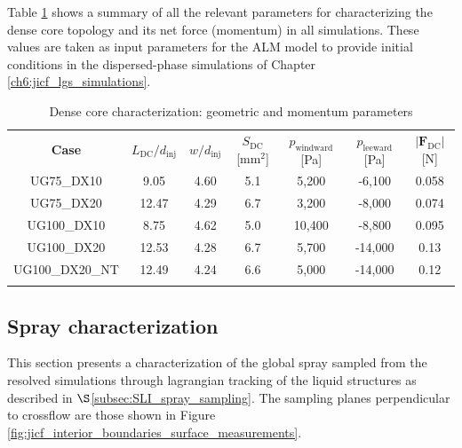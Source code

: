 Table \ref{tab:dense_core_geometry_pressures_and_force_parameters} shows a summary of all the relevant parameters for characterizing the dense core topology and its net force (momentum) in all simulations. These values are taken as input parameters for the ALM model to provide initial conditions in the dispersed-phase simulations of Chapter \ref{ch6:jicf_lgs_simulations}.


\begin{table}[!h]
\centering
\caption{Dense core characterization: geometric and momentum parameters}
\vspace*{-0.1in}
\begin{tabular}{ccccccc}
\thickhline
\textbf{Case} & $L_\mathrm{DC}/d_\mathrm{inj}$ & $w/d_\mathrm{inj}$ & $S_\mathrm{DC}$ [mm$^2$] & $p_\mathrm{windward}$ [Pa] & $p_\mathrm{leeward}$ [Pa]  & $|\boldsymbol{F}_\mathrm{DC}|$ [N] \\
\thickhline 
UG75\_DX10  & 9.05 & 4.60 & 5.1 & 5,200 & -6,100 & 0.058  \\
UG75\_DX20  & 12.47 & 4.29 & 6.7 & 3,200 & -8,000 &  0.074 \\
UG100\_DX10 & 8.75 & 4.62 & 5.0 & 10,400 & -8,800 & 0.095 \\
UG100\_DX20 & 12.53 & 4.28 & 6.7 & 5,700 & -14,000 & 0.13 \\
UG100\_DX20\_NT & 12.49 & 4.24 & 6.6 & 5,000 & -14,000 & 0.12 \\
\thickhline
\end{tabular}
\label{tab:dense_core_geometry_pressures_and_force_parameters}
\end{table}




\vspace*{-0.05in}

\subsection{Spray characterization}
\label{subsec:ch5_sec_spray_characterization}


This section presents a characterization of the global spray sampled from the resolved simulations through lagrangian tracking of the liquid structures as described in $\S$\ref{subsec:SLI_spray_sampling}. The sampling planes perpendicular to crossflow are those shown in Figure \ref{fig:jicf_interior_boundaries_surface_measurements}.



